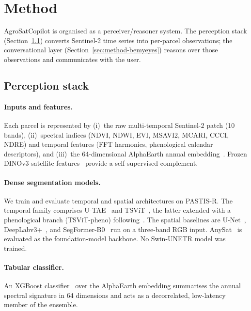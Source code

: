 \section{Method}
\label{sec:method}

AgroSatCopilot is organised as a perceiver/reasoner system. The
perception stack (Section~\ref{sec:method-perception}) converts
Sentinel-2 time series into per-parcel observations; the conversational
layer (Section~\ref{sec:method-bemyeyes}) reasons over those
observations and communicates with the user.

\subsection{Perception stack}
\label{sec:method-perception}

\paragraph{Inputs and features.}
Each parcel is represented by (i)~the raw multi-temporal Sentinel-2
patch (10 bands), (ii)~spectral indices (NDVI, NDWI, EVI, MSAVI2,
MCARI, CCCI, NDRE) and temporal features (FFT harmonics, phenological
calendar descriptors), and (iii)~the 64-dimensional AlphaEarth
annual embedding~\cite{brown2025alphaearth}. Frozen
DINOv3-satellite features~\cite{oquab2023dinov3} provide a
self-supervised complement.

\paragraph{Dense segmentation models.}
We train and evaluate temporal and spatial architectures on PASTIS-R.
The temporal family comprises U-TAE~\cite{garnot2021utae} and
TSViT~\cite{tarasiou2023tsvit}, the latter extended with a phenological
branch (TSViT-pheno) following~\cite{wen2025phenology}. The spatial
baselines are U-Net~\cite{ronneberger2015unet},
DeepLabv3+~\cite{chen2018deeplabv3plus}, and
SegFormer-B0~\cite{xie2021segformer} run on a three-band RGB input.
AnySat~\cite{astruc2024anysat} is evaluated as the foundation-model
backbone. No Swin-UNETR model was trained.

\paragraph{Tabular classifier.}
An XGBoost classifier~\cite{chen2016xgboost} over the AlphaEarth
embedding summarises the annual spectral signature in 64 dimensions and
acts as a decorrelated, low-latency member of the ensemble.

